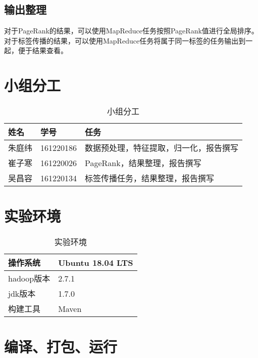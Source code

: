 \subsection{输出整理}
对于PageRank的结果，可以使用MapReduce任务按照PageRank值进行全局排序。\\
对于标签传播的结果，可以使用MapReduce任务将属于同一标签的任务输出到一起，便于结果查看。
\section{小组分工}
\begin{table}[!htbp]
	\centering
	\caption{小组分工}
	\begin{tabular} {|p{50pt}|p{80pt}|p{250pt}|}
		\hline
		姓名& 学号 &任务\\
		\hline
		朱庭纬&161220186&数据预处理，特征提取，归一化，报告撰写\\
		\hline
		崔子寒&161220026&PageRank，结果整理，报告撰写\\
		\hline
		吴昌容&161220134&标签传播任务，结果整理，报告撰写\\
		\hline
	\end{tabular}
\end{table}
\section{实验环境}
\begin{table}[!htbp]
	\centering
	\caption{实验环境}
	\begin{tabular} {|p{80pt}|p{160pt}|}
		\hline
		操作系统&Ubuntu 18.04 LTS\\
		\hline
		hadoop版本& 2.7.1\\
		\hline
		jdk版本& 1.7.0\\
		\hline
		构建工具&Maven\\
		\hline
	\end{tabular}
\end{table}
\section{编译、打包、运行}
